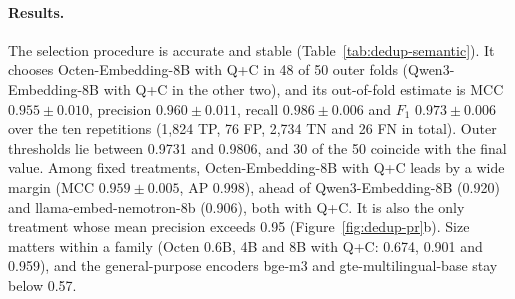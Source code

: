 \paragraph{Results.} The selection procedure is accurate and stable
(Table~\ref{tab:dedup-semantic}). It chooses Octen-Embedding-8B with Q+C in
48 of 50 outer folds (Qwen3-Embedding-8B with Q+C in the other two), and its
out-of-fold estimate is MCC $0.955 \pm 0.010$, precision $0.960 \pm 0.011$,
recall $0.986 \pm 0.006$ and $F_1$ $0.973 \pm 0.006$ over the ten
repetitions (1,824 TP, 76 FP, 2,734 TN and 26 FN in total). Outer thresholds
lie between 0.9731 and 0.9806, and 30 of the 50 coincide with the final
value. Among fixed treatments, Octen-Embedding-8B with Q+C leads by a wide
margin (MCC $0.959 \pm 0.005$, AP 0.998), ahead of Qwen3-Embedding-8B (0.920)
and llama-embed-nemotron-8b (0.906), both with Q+C. It is also the only
treatment whose mean precision exceeds 0.95 (Figure~\ref{fig:dedup-pr}b).
Size matters within a family (Octen 0.6B, 4B and 8B with Q+C: 0.674, 0.901
and 0.959), and the general-purpose encoders bge-m3 and gte-multilingual-base
stay below 0.57.

